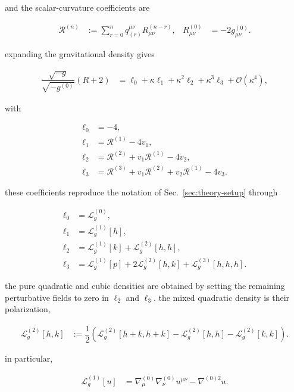 and the scalar-curvature coefficients are

\begin{align}
\mathcal{R}^{(n)} & :=\sum _{r=0}^{n}q_{(r)}^{\mu \nu}R_{\mu \nu}^{(n-r)}, & R_{\mu \nu}^{(0)}&=-2g_{\mu \nu}^{(0)}.
\end{align}

expanding the gravitational density gives

\begin{align}
\dfrac{\sqrt{-g}}{\sqrt{-g^{(0)}}}(R+2) & =\ell _{0}+\kappa \ell _{1}+\kappa ^2\ell _{2}+\kappa ^3\ell _{3}+\mathcal{O}(\kappa ^4),
\end{align}

with

\[\begin{aligned}
\ell _{0} & =-4, \\
\ell _{1} & =\mathcal{R}^{(1)}-4v_{1}, \\
\ell _{2} & =\mathcal{R}^{(2)}+v_{1}\mathcal{R}^{(1)}-4v_{2}, \\
\ell _{3} & =\mathcal{R}^{(3)}+v_{1}\mathcal{R}^{(2)}+v_{2}\mathcal{R}^{(1)}-4v_{3}.
\end{aligned}\]

these coefficients reproduce the notation of Sec.~\ref{sec:theory-setup} through

\[\begin{aligned}
\ell _{0} & =\mathcal{L}_{g}^{(0)}, \\
\ell _{1} & =\mathcal{L}_{g}^{(1)}[h], \\
\ell _{2} & =\mathcal{L}_{g}^{(1)}[k]+\mathcal{L}_{g}^{(2)}[h,h], \\
\ell _{3} & =\mathcal{L}_{g}^{(1)}[p]+2\mathcal{L}_{g}^{(2)}[h,k]+\mathcal{L}_{g}^{(3)}[h,h,h].
\end{aligned}\]

the pure quadratic and cubic densities are obtained by setting the remaining perturbative fields to zero in $\displaystyle{\ell _2}$ and $\displaystyle{\ell _3}$. the mixed quadratic density is their polarization,

\begin{align}
\mathcal{L}_{g}^{(2)}[h,k] & :=\dfrac{1}{2}\left(\mathcal{L}_{g}^{(2)}[h+k,h+k]-\mathcal{L}_{g}^{(2)}[h,h]-\mathcal{L}_{g}^{(2)}[k,k]\right).
\end{align}

in particular,

\begin{align}
\mathcal{L}_{g}^{(1)}[u] & =\nabla ^{(0)}_{\mu}\nabla ^{(0)}_{\nu}u^{\mu \nu}-\nabla ^{(0)2}u.
\end{align}

